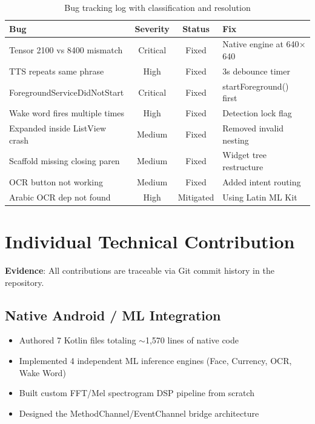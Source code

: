 \documentclass[12pt,a4paper]{article}
\begin{document}
\begin{table}[h]
\centering
\begin{tabular}{p{4.5cm}ccp{3.5cm}}
\toprule
\textbf{Bug} & \textbf{Severity} & \textbf{Status} & \textbf{Fix} \\
\midrule
Tensor 2100 vs 8400 mismatch & Critical & Fixed & Native engine at 640$\times$640 \\
TTS repeats same phrase & High & Fixed & 3s debounce timer \\
ForegroundServiceDidNotStart & Critical & Fixed & startForeground() first \\
Wake word fires multiple times & High & Fixed & Detection lock flag \\
Expanded inside ListView crash & Medium & Fixed & Removed invalid nesting \\
Scaffold missing closing paren & Medium & Fixed & Widget tree restructure \\
OCR button not working & Medium & Fixed & Added intent routing \\
Arabic OCR dep not found & High & Mitigated & Using Latin ML Kit \\
\bottomrule
\end{tabular}
\caption{Bug tracking log with classification and resolution}
\end{table}

\section{Individual Technical Contribution}

\textbf{Evidence}: All contributions are traceable via Git commit history in the repository.

\subsection{Native Android / ML Integration}
\begin{itemize}
  \item Authored 7 Kotlin files totaling $\sim$1,570 lines of native code
  \item Implemented 4 independent ML inference engines (Face, Currency, OCR, Wake Word)
  \item Built custom FFT/Mel spectrogram DSP pipeline from scratch
  \item Designed the MethodChannel/EventChannel bridge architecture
\end{itemize}
\end{document}
